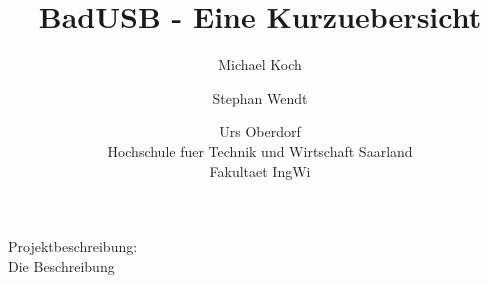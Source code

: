 \documentclass[ a4paper, 12pt, ]{article}
\title{BadUSB - Eine Kurzuebersicht}
\author{Michael Koch \and{Stephan Wendt} \and{Urs Oberdorf}\\Hochschule fuer Technik und Wirtschaft Saarland\\Fakultaet IngWi}
\date{} %
\begin{document}
\maketitle
Projektbeschreibung:\\
Die Beschreibung
\end{document}
